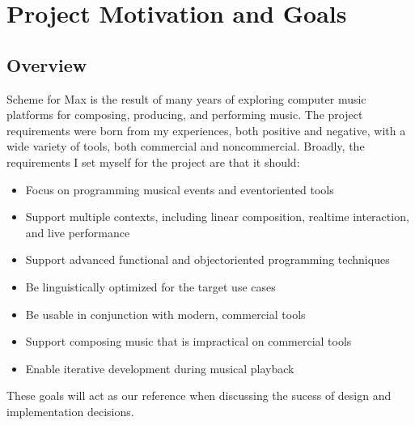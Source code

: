 \documentclass[letterpaper,10pt,english]{sphinxmanual}
\begin{document}
\sphinxstepscope


\chapter{Project Motivation and Goals}
\label{\detokenize{goals:project-motivation-and-goals}}\label{\detokenize{goals::doc}}

\section{Overview}
\label{\detokenize{goals:overview}}
\sphinxAtStartPar
Scheme for Max is the result of many years of exploring computer music platforms for composing, producing,
and performing music.
The project requirements were born from my experiences, both positive and negative, with a wide variety
of tools, both commercial and non\sphinxhyphen{}commercial.
Broadly, the requirements I set myself for the project are that it should:
\begin{itemize}
\item {} 
\sphinxAtStartPar
Focus on programming musical events and event\sphinxhyphen{}oriented tools

\item {} 
\sphinxAtStartPar
Support multiple contexts, including linear composition, real\sphinxhyphen{}time interaction, and live performance

\item {} 
\sphinxAtStartPar
Support advanced functional and object\sphinxhyphen{}oriented programming techniques

\item {} 
\sphinxAtStartPar
Be linguistically optimized for the target use cases

\item {} 
\sphinxAtStartPar
Be usable in conjunction with modern, commercial tools

\item {} 
\sphinxAtStartPar
Support composing music that is impractical on commercial tools

\item {} 
\sphinxAtStartPar
Enable iterative development during musical playback

\end{itemize}

\sphinxAtStartPar
These goals will act as our reference when discussing the sucess of design and implementation decisions.
\end{document}
